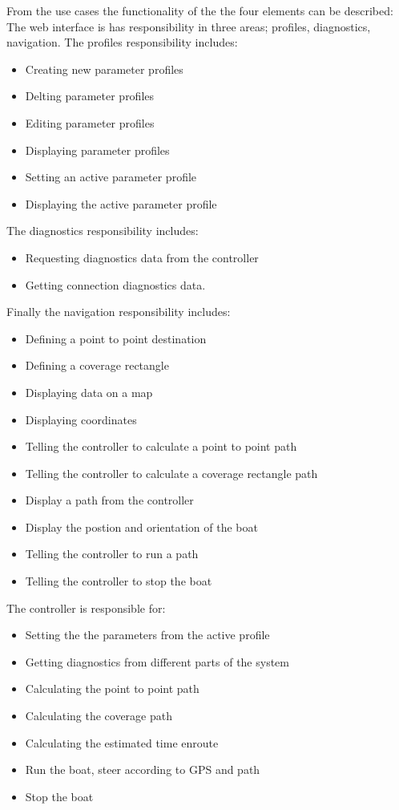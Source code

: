 From the use cases the functionality of the the four elements can be described:
The web interface is has responsibility in three areas; profiles, diagnostics, navigation.
The profiles responsibility includes:
\begin{itemize}
\item Creating new parameter profiles
\item Delting parameter profiles
\item Editing parameter profiles
\item Displaying parameter profiles
\item Setting an active parameter profile
\item Displaying the active parameter profile
\end{itemize}
The diagnostics responsibility includes:
\begin{itemize}
\item Requesting diagnostics data from the controller
\item Getting connection diagnostics data.
\end{itemize}
Finally the navigation responsibility includes:
\begin{itemize}
\item Defining a point to point destination
\item Defining a coverage rectangle
\item Displaying data on a map
\item Displaying coordinates
\item Telling the controller to calculate a point to point path
\item Telling the controller to calculate a coverage rectangle path
\item Display a path from the controller
\item Display the postion and orientation of the boat
\item Telling the controller to run a path
\item Telling the controller to stop the boat
\end{itemize}
The controller is responsible for:
\begin{itemize}
\item Setting the the parameters from the active profile
\item Getting diagnostics from different parts of the system
\item Calculating the point to point path
\item Calculating the coverage path
\item Calculating the estimated time enroute
\item Run the boat, steer according to GPS and path
\item Stop the boat
\end{itemize}

